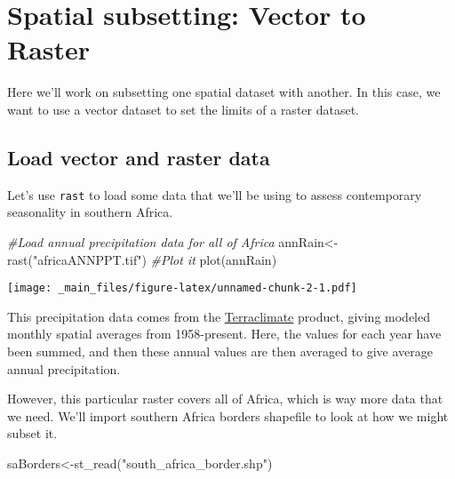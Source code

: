 \documentclass[
]{book}
\newenvironment{Shaded}{\begin{snugshade}}{\end{snugshade}}
\newcommand{\CommentTok}[1]{\textcolor[rgb]{0.56,0.35,0.01}{\textit{#1}}}
\newcommand{\FunctionTok}[1]{\textcolor[rgb]{0.00,0.00,0.00}{#1}}
\newcommand{\NormalTok}[1]{#1}
\newcommand{\OtherTok}[1]{\textcolor[rgb]{0.56,0.35,0.01}{#1}}
\newcommand{\StringTok}[1]{\textcolor[rgb]{0.31,0.60,0.02}{#1}}
\begin{document}
\hypertarget{spatial-subsetting-vector-to-raster}{%
\chapter{Spatial subsetting: Vector to Raster}\label{spatial-subsetting-vector-to-raster}}

Here we'll work on subsetting one spatial dataset with another. In this case, we want to use a vector dataset to set the limits of a raster dataset.

\hypertarget{load-vector-and-raster-data}{%
\section{Load vector and raster data}\label{load-vector-and-raster-data}}

Let's use \texttt{rast} to load some data that we'll be using to assess contemporary seasonality in southern Africa.

\begin{Shaded}
\begin{Highlighting}[]
\CommentTok{\#Load annual precipitation data for all of Africa}
\NormalTok{annRain}\OtherTok{\textless{}{-}}\FunctionTok{rast}\NormalTok{(}\StringTok{"africaANNPPT.tif"}\NormalTok{)}
\CommentTok{\#Plot it}
\FunctionTok{plot}\NormalTok{(annRain)}
\end{Highlighting}
\end{Shaded}

\texttt{[image: \_main\_files/figure-latex/unnamed-chunk-2-1.pdf]}

This precipitation data comes from the \href{https://www.climatologylab.org/terraclimate.html}{Terraclimate} product, giving modeled monthly spatial averages from 1958-present. Here, the values for each year have been summed, and then these annual values are then averaged to give average annual precipitation.

However, this particular raster covers all of Africa, which is way more data that we need. We'll import southern Africa borders shapefile to look at how we might subset it.

\begin{Shaded}
\begin{Highlighting}[]
\NormalTok{saBorders}\OtherTok{\textless{}{-}}\FunctionTok{st\_read}\NormalTok{(}\StringTok{"south\_africa\_border.shp"}\NormalTok{)}
\end{Highlighting}
\end{Shaded}
\end{document}

